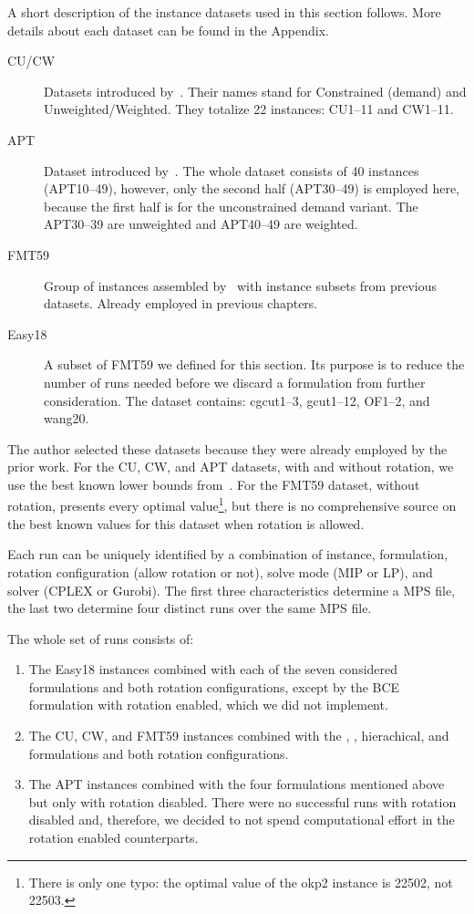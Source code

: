 A short description of the instance datasets used in this section follows.
More details about each dataset can be found in the Appendix.

\begin{description}
	\item [CU/CW] Datasets introduced by~\citet{fayard:1998}. Their names stand for Constrained (demand) and Unweighted/Weighted. They totalize 22 instances: CU1--11 and CW1--11.
	\item [APT] Dataset introduced by~\citet{alvarez:2002:tabu}. The whole dataset consists of 40 instances (APT10--49), however, only the second half (APT30--49) is employed here, because the first half is for the unconstrained demand variant. The APT30--39 are unweighted and APT40--49 are weighted.
	\item [FMT59] Group of instances assembled by~\cite{furini:2016} with instance subsets from previous datasets. Already employed in previous chapters.
	\item [Easy18] A subset of FMT59 we defined for this section. Its purpose is to reduce the number of runs needed before we discard a formulation from further consideration. The dataset contains: cgcut1--3, gcut1--12, OF1--2, and wang20.
\end{description}

The author selected these datasets because they were already employed by the prior work.
For the CU, CW, and APT datasets, with and without rotation, we use the best known lower bounds from~\citet{velasco:2019}.
For the FMT59 dataset, without rotation, \citet{furini:2016} presents every optimal value\footnote{There is only one typo: the optimal value of the okp2 instance is 22502, not 22503.}, but there is no comprehensive source on the best known values for this dataset when rotation is allowed.

Each run can be uniquely identified by a combination of instance, formulation, rotation configuration (allow rotation or not), solve mode (MIP or LP), and solver (CPLEX or Gurobi).
The first three characteristics determine a MPS file, the last two determine four distinct runs over the same MPS file.

The whole set of runs consists of:
\begin{enumerate}
\item The Easy18 instances combined with each of the seven considered formulations and both rotation configurations, except by the BCE formulation with rotation enabled, which we did not implement.
\item The CU, CW, and FMT59 instances combined with the {\modelBecker}, {\modelOrigami}, hierachical, and {\modelImplicit} formulations and both rotation configurations.
\item The APT instances combined with the four formulations mentioned above but only with rotation disabled. There were no successful runs with rotation disabled and, therefore, we decided to not spend computational effort in the rotation enabled counterparts. %
\end{enumerate}

